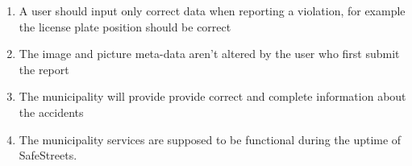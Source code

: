 \begin{enumerate}

\item A user should input only correct data when reporting a violation, for example the license plate position should be correct

\item The image and picture meta-data aren't altered by the user who first submit the report

\item The municipality will provide provide correct and complete information 
about the accidents

\item The municipality services are supposed to be functional during the uptime of SafeStreets.

\end{enumerate}